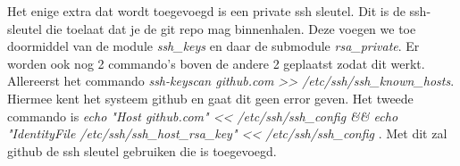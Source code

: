 Het enige extra dat wordt toegevoegd is een private ssh sleutel. Dit is de ssh-sleutel die toelaat dat je de git repo mag binnenhalen. Deze voegen we toe doormiddel van de module \textit{ssh\_keys} en daar de submodule \textit{rsa\_private}. Er worden ook nog 2 commando's boven de andere 2 geplaatst zodat dit werkt. Allereerst het commando \textit{ssh-keyscan github.com >> /etc/ssh/ssh\_known\_hosts}. Hiermee kent het systeem github en gaat dit geen error geven. Het tweede commando is \textit{echo "Host github.com" << /etc/ssh/ssh\_config \&\& echo "IdentityFile /etc/ssh/ssh\_host\_rsa\_key" << /etc/ssh/ssh\_config } . Met dit zal github de ssh sleutel gebruiken die is toegevoegd.
